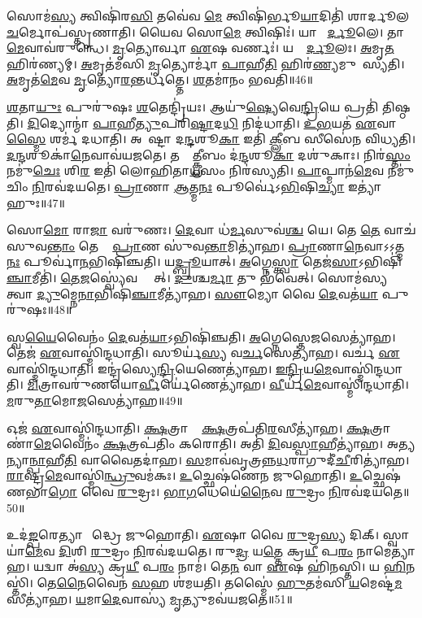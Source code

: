 𑌸𑍋𑌮॑\ul{𑌸𑍍𑌯} 𑌤𑍍𑌵𑌿𑌷𑌿॑𑌰\ul{𑌸𑌿} 𑌤𑌵𑍇॑𑌵 \ul{𑌮𑍇} 𑌤𑍍𑌵𑌿𑌷𑌿॑𑌰𑍍𑌭𑍂\ul{𑌯𑌾}𑌦𑌿𑌤𑌿॑ 𑌶𑌾𑌰𑍍𑌦𑍂𑌲\-\ul{𑌚}𑌰𑍍𑌮𑍋𑌪॑𑌸𑍍𑌤𑍃𑌣𑌾𑌤𑌿।
𑌯𑍈𑌵 𑌸𑍋\ul{𑌮𑍇} 𑌤𑍍𑌵𑌿𑌷𑌿𑌃॑।
𑌯𑌾 𑌶𑌾᳚\ul{𑌰𑍍𑌦𑍂}𑌲𑍇।
𑌤𑌾\ul{𑌮𑍇}𑌵𑌾𑌵॑𑌰𑍁𑌨𑍍𑌧𑍇।
\ul{𑌮𑍃}𑌤𑍍𑌯𑍋𑌰𑍍𑌵𑌾 \ul{𑌏}𑌷 𑌵𑌰𑍍𑌣𑌃॑।
𑌯𑌚𑍍𑌛𑌾᳚\ul{𑌰𑍍𑌦𑍂}𑌲𑌃।
\ul{𑌅}𑌮𑍃\ul{𑌤}\ul{} 𑌹𑌿𑌰॑𑌣𑍍𑌯𑌮𑍍।
\ul{𑌅}𑌮𑍃𑌤॑𑌮𑌸𑌿 \ul{𑌮𑍃}𑌤𑍍𑌯𑍋𑌰𑍍𑌮𑌾॑ \ul{𑌪𑌾}𑌹𑍀\ul{𑌤𑌿} 𑌹𑌿𑌰॑\ul{𑌣𑍍𑌯}𑌮𑍁𑌪𑌾᳚𑌸𑍍𑌯𑌤𑌿।
\ul{𑌅}𑌮𑍃𑌤॑\ul{𑌮𑍇}𑌵 \ul{𑌮𑍃}𑌤𑍍𑌯𑍋\ul{𑌰}𑌨𑍍𑌤𑌰𑍍𑌧॑𑌤𑍍𑌤𑍇।
\ul{𑌶}𑌤𑌮𑌾॑𑌨𑌂 𑌭𑌵𑌤𑌿॥46॥

\ul{𑌶}𑌤𑌾\ul{𑌯𑍁𑌃} 𑌪𑍁𑌰𑍁॑𑌷𑌃 \ul{𑌶}𑌤𑍇𑌨𑍍𑌦𑍍𑌰𑌿॑𑌯𑌃।
𑌆𑌯𑍁॑\ul{𑌷𑍍𑌯𑍇}𑌵𑍇\ul{𑌨𑍍𑌦𑍍𑌰𑌿}𑌯𑍇 𑌪𑍍𑌰𑌤𑌿॑ 𑌤𑌿𑌷𑍍𑌠𑌤𑌿।
\ul{𑌦𑌿}𑌦𑍍𑌯𑍋𑌨𑍍𑌮𑌾॑ \ul{𑌪𑌾}𑌹𑍀\ul{𑌤𑍍𑌯𑍁}𑌪𑌰𑌿॑\ul{𑌷𑍍𑌟𑌾}𑌦\ul{𑌧𑌿} 𑌨𑌿𑌦॑𑌧𑌾𑌤𑌿।
\ul{𑌉}\ul{𑌭}𑌯𑌤॑ \ul{𑌏}𑌵𑌾\ul{𑌸𑍍𑌮𑍈} 𑌶𑌰𑍍𑌮॑ 𑌦𑌧𑌾𑌤𑌿।
𑌅𑌵𑍇᳚𑌷𑍍𑌟𑌾 𑌦\ul{𑌨𑍍𑌦}𑌶𑍂\ul{𑌕𑌾} 𑌇𑌤𑌿॑ \ul{𑌕𑍍𑌲𑍀}𑌬 𑌸𑍀𑌸𑍇॑𑌨 𑌵𑌿𑌧𑍍𑌯𑌤𑌿।
\ul{𑌦}\ul{𑌨𑍍𑌦}𑌶𑍂𑌕𑌾॑\ul{𑌨𑍇}𑌵𑌾𑌵॑𑌯𑌜𑌤𑍇।
𑌤𑌸𑍍𑌮𑌾᳚\ul{𑌤𑍍𑌕𑍍𑌲𑍀}𑌬𑌂 𑌦॑\ul{𑌨𑍍𑌦}𑌶𑍂\ul{𑌕𑌾} 𑌦𑌶𑍁॑𑌕𑌾𑌃।
𑌨𑌿𑌰॑\ul{𑌸𑍍𑌤𑌂} 𑌨𑌮𑍁॑\ul{𑌚𑍇𑌃} 𑌶𑌿\ul{𑌰} 𑌇𑌤𑌿॑ 𑌲𑍋𑌹𑌿𑌤𑌾\ul{𑌯}𑌸𑌂 𑌨𑌿𑌰॑𑌸𑍍𑌯𑌤𑌿।
\ul{𑌪𑌾}𑌪𑍍𑌮𑌾𑌨॑\ul{𑌮𑍇}𑌵 𑌨𑌮𑍁॑𑌚𑌿𑌂 \ul{𑌨𑌿}𑌰𑌵॑𑌦𑌯𑌤𑍇।
\ul{𑌪𑍍𑌰𑌾}𑌣𑌾 \ul{𑌆}𑌤𑍍𑌮\ul{𑌨𑌃} 𑌪𑍂𑌰𑍍𑌵𑍇॑\-𑌽\ul{𑌭𑌿}𑌷𑌿\ul{𑌚𑍍𑌯𑌾} 𑌇𑌤𑍍𑌯𑌾॑𑌹𑍁𑌃॥47॥

𑌸𑍋\ul{𑌮𑍋} 𑌰𑌾\ul{𑌜𑌾} 𑌵𑌰𑍁॑𑌣𑌃।
\ul{𑌦𑍇}𑌵𑌾 𑌧॑\ul{𑌰𑍍𑌮}𑌸𑍁𑌵॑\ul{𑌶𑍍𑌚} 𑌯𑍇।
𑌤𑍇 \ul{𑌤𑍇} 𑌵𑌾𑌚॑ 𑌸𑍁𑌵\ul{𑌨𑍍𑌤𑌾𑌂} 𑌤𑍇 𑌤𑍇᳚ \ul{𑌪𑍍𑌰𑌾}𑌣 𑌸𑍁॑𑌵\ul{𑌨𑍍𑌤𑌾}𑌮𑌿𑌤𑍍𑌯𑌾॑𑌹।
\ul{𑌪𑍍𑌰𑌾}𑌣𑌾\ul{𑌨𑍇}𑌵𑌾\-𑌽𑌽𑌤𑍍𑌮\ul{𑌨𑌃} 𑌪𑍂𑌰𑍍𑌵𑌾॑\ul{𑌨}𑌭𑌿𑌷𑌿॑𑌞𑍍𑌚𑌤𑌿।
𑌯\ul{𑌦𑍍𑌬𑍍𑌰𑍂}𑌯𑌾𑌤𑍍।
\ul{𑌅}𑌗𑍍𑌨𑍇\ul{𑌸𑍍𑌤𑍍𑌵𑌾} 𑌤𑍇𑌜॑\ul{𑌸𑌾}\-𑌽𑌭𑌿𑌷𑌿॑\ul{𑌞𑍍𑌚𑌾}𑌮𑍀𑌤𑌿॑।
\ul{𑌤𑍇}\ul{𑌜}𑌸𑍍𑌵𑍍𑌯𑍇॑𑌵 𑌸𑍍𑌯𑌾᳚𑌤𑍍।
\ul{𑌦𑍁}𑌶𑍍𑌚\ul{𑌰𑍍𑌮𑌾} 𑌤𑍁 𑌭॑𑌵𑍇𑌤𑍍।
𑌸𑍋𑌮॑𑌸𑍍𑌯 𑌤𑍍𑌵𑌾 \ul{𑌦𑍍𑌯𑍁}𑌮𑍍𑌨𑍇\ul{𑌨𑌾}𑌭𑌿𑌷𑌿॑\ul{𑌞𑍍𑌚𑌾}𑌮𑍀𑌤𑍍𑌯𑌾॑𑌹।
\ul{𑌸𑍗}𑌮𑍍𑌯𑍋 𑌵𑍈 \ul{𑌦𑍇}𑌵𑌤॑\ul{𑌯𑌾} 𑌪𑍁𑌰𑍁॑𑌷𑌃॥48॥

𑌸𑍍𑌵\ul{𑌯𑍈}𑌵𑍈𑌨𑌂॑ \ul{𑌦𑍇}𑌵𑌤॑\ul{𑌯𑌾}\-𑌽𑌭𑌿𑌷𑌿॑𑌞𑍍𑌚𑌤𑌿।
\ul{𑌅}𑌗𑍍𑌨𑍇𑌸𑍍𑌤𑍇\ul{𑌜}𑌸𑍇𑌤𑍍𑌯𑌾॑𑌹।
𑌤𑍇𑌜॑ \ul{𑌏}𑌵𑌾𑌸𑍍𑌮𑌿॑𑌨𑍍𑌦𑌧𑌾𑌤𑌿।
𑌸𑍂𑌰𑍍𑌯॑\ul{𑌸𑍍𑌯} 𑌵\ul{𑌰𑍍𑌚}𑌸𑍇𑌤𑍍𑌯𑌾॑𑌹।
𑌵𑌰𑍍𑌚॑ \ul{𑌏}𑌵𑌾𑌸𑍍𑌮𑌿॑𑌨𑍍𑌦𑌧𑌾𑌤𑌿।
𑌇𑌨𑍍𑌦𑍍𑌰॑𑌸𑍍𑌯𑍇\ul{𑌨𑍍𑌦𑍍𑌰𑌿}𑌯𑍇𑌣𑍇𑌤𑍍𑌯𑌾॑𑌹।
\ul{𑌇}\ul{𑌨𑍍𑌦𑍍𑌰𑌿}𑌯\ul{𑌮𑍇}𑌵𑌾𑌸𑍍𑌮𑌿॑𑌨𑍍𑌦𑌧𑌾𑌤𑌿।
\ul{𑌮𑌿}𑌤𑍍𑌰𑌾𑌵𑌰𑍁॑𑌣\-𑌯𑍋\ul{𑌰𑍍𑌵𑍀}𑌰𑍍𑌯𑍇॑𑌣𑍇𑌤𑍍𑌯𑌾॑𑌹।
\ul{𑌵𑍀}𑌰𑍍𑌯॑\ul{𑌮𑍇}𑌵𑌾𑌸𑍍𑌮𑌿॑𑌨𑍍𑌦𑌧𑌾𑌤𑌿।
\ul{𑌮}𑌰𑍁\ul{𑌤𑌾}𑌮𑍋\ul{𑌜}𑌸𑍇𑌤𑍍𑌯𑌾॑𑌹॥49॥

𑌓𑌜॑ \ul{𑌏}𑌵𑌾𑌸𑍍𑌮𑌿॑𑌨𑍍𑌦𑌧𑌾𑌤𑌿।
\ul{𑌕𑍍𑌷}𑌤𑍍𑌰𑌾𑌣𑌾𑌂᳚ \ul{𑌕𑍍𑌷}𑌤𑍍𑌰𑌪॑𑌤𑌿\ul{𑌰}𑌸𑍀𑌤𑍍𑌯𑌾॑𑌹।
\ul{𑌕𑍍𑌷}𑌤𑍍𑌰𑌾𑌣𑌾॑\ul{𑌮𑍇}𑌵𑍈𑌨𑌂॑ \ul{𑌕𑍍𑌷}𑌤𑍍𑌰𑌪॑𑌤𑌿𑌂 𑌕𑌰𑍋𑌤𑌿।
𑌅𑌤𑌿॑ \ul{𑌦𑌿}𑌵\ul{𑌸𑍍𑌪𑌾}𑌹𑍀𑌤𑍍𑌯𑌾॑𑌹।
𑌅\ul{𑌤𑍍𑌯}𑌨𑍍𑌯𑌾\ul{𑌨𑍍𑌪𑌾}𑌹𑍀\ul{𑌤𑌿} 𑌵𑌾𑌵𑍈𑌤𑌦𑌾॑𑌹।
\ul{𑌸}𑌮𑌾𑌵॑𑌵𑍃𑌤𑍍𑌰𑌨𑍍𑌨\ul{𑌧}𑌰𑌾𑌗𑍁𑌦𑍀॑\ul{𑌚𑍀}\-𑌰𑌿𑌤𑍍𑌯𑌾॑𑌹।
\ul{𑌰𑌾}𑌷𑍍𑌟𑍍𑌰\ul{𑌮𑍇}𑌵𑌾𑌸𑍍𑌮𑌿॑\ul{𑌨𑍍𑌧𑍍𑌰𑍁}𑌵𑌮॑𑌕𑌃।
\ul{𑌉}𑌚𑍍𑌛𑍇𑌷॑𑌣𑍇𑌨 𑌜𑍁𑌹𑍋𑌤𑌿।
\ul{𑌉}𑌚𑍍𑌛𑍇𑌷॑𑌣𑌭𑌾\ul{𑌗𑍋} 𑌵𑍈 \ul{𑌰𑍁}𑌦𑍍𑌰𑌃।
\ul{𑌭𑌾}\ul{𑌗}𑌧𑍇𑌯𑍇॑\ul{𑌨𑍈}𑌵 \ul{𑌰𑍁}𑌦𑍍𑌰𑌂 \ul{𑌨𑌿}𑌰𑌵॑𑌦𑌯𑌤𑍇॥50॥

𑌉𑌦॑\ul{𑌙𑍍𑌪}𑌰𑍇𑌤𑍍𑌯𑌾𑌗𑍍𑌨𑍀᳚𑌦𑍍𑌧𑍍𑌰𑍇 𑌜𑍁𑌹𑍋𑌤𑌿।
\ul{𑌏}𑌷𑌾 𑌵𑍈 \ul{𑌰𑍁}𑌦𑍍𑌰\ul{𑌸𑍍𑌯} 𑌦𑌿𑌕𑍍।
𑌸𑍍𑌵𑌾𑌯𑌾॑\ul{𑌮𑍇}𑌵 \ul{𑌦𑌿}𑌶𑌿 \ul{𑌰𑍁}𑌦𑍍𑌰𑌂 \ul{𑌨𑌿}𑌰𑌵॑𑌦𑌯𑌤𑍇।
𑌰𑍁\ul{𑌦𑍍𑌰} 𑌯\ul{𑌤𑍍𑌤𑍇} 𑌕𑍍𑌰\ul{𑌯𑍀} 𑌪\ul{𑌰𑌂} 𑌨𑌾𑌮𑍇𑌤𑍍𑌯𑌾॑𑌹।
𑌯𑌦𑍍𑌵𑌾 𑌅॑\ul{𑌸𑍍𑌯} 𑌕𑍍𑌰\ul{𑌯𑍀} 𑌪\ul{𑌰𑌂} 𑌨𑌾𑌮॑।
𑌤𑍇\ul{𑌨} 𑌵𑌾 \ul{𑌏}𑌷 𑌹𑌿॑𑌨𑌸𑍍𑌤𑌿।
𑌯 \ul{𑌹𑌿}𑌨𑌸𑍍𑌤𑌿॑।
𑌤𑍇\ul{𑌨𑍈}𑌵𑍈𑌨॑ \ul{𑌸}𑌹 𑌶॑𑌮𑌯𑌤𑌿।
𑌤𑌸𑍍𑌮𑍈॑ \ul{𑌹𑍁}𑌤𑌮॑𑌸𑌿 \ul{𑌯}𑌮𑍇𑌷𑍍𑌟॑\ul{𑌮}𑌸𑍀𑌤𑍍𑌯𑌾॑𑌹।
\ul{𑌯}𑌮𑌾\ul{𑌦𑍇}𑌵𑌾𑌸𑍍𑌯॑ \ul{𑌮𑍃}𑌤𑍍𑌯𑍁𑌮𑌵॑𑌯𑌜𑌤𑍇॥51॥


